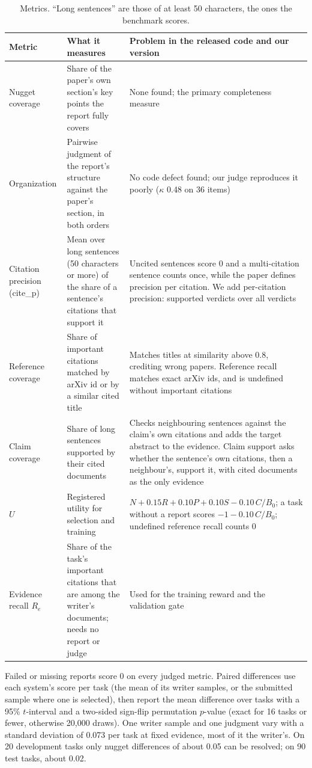 \documentclass[11pt, letterpaper]{article}
\begin{document}
\begin{table}[H]
\centering\footnotesize\setlength{\tabcolsep}{3pt}
\begin{tabularx}{\linewidth}{>{\raggedright}p{2.6cm} X X}
\toprule
Metric & What it measures & Problem in the released code and our version\\
\midrule
Nugget coverage & Share of the paper's own section's key points the report fully covers & None found;
the primary completeness measure\\
Organization & Pairwise judgment of the report's structure against the paper's section, in both
orders & No code defect found; our judge reproduces it poorly ($\kappa$ 0.48 on 36 items)\\
Citation precision (cite\_p) & Mean over long sentences (50 characters or more) of the share of a
sentence's citations that support it & Uncited sentences score 0 and a multi-citation sentence counts
once, while the paper defines precision per citation. We add per-citation precision: supported
verdicts over all verdicts\\
Reference coverage & Share of important citations matched by arXiv id or by a similar cited title & Matches titles at
similarity above 0.8, crediting wrong papers. Reference recall matches exact arXiv ids, and is
undefined without important citations\\
Claim coverage & Share of long sentences supported by their cited documents & Checks neighbouring
sentences against the claim's own citations and adds the target abstract to the evidence. Claim
support asks whether the sentence's own citations, then a neighbour's, support it, with cited
documents as the only evidence\\
$U$ & Registered utility for selection and training & $N + 0.15R + 0.10P + 0.10S - 0.10\,C/B_0$; a
task without a report scores $-1 - 0.10\,C/B_0$; undefined reference recall counts 0\\
Evidence recall $R_e$ & Share of the task's important citations that are among the writer's documents; needs no report
or judge & Used for the training reward and the validation gate\\
\bottomrule
\end{tabularx}
\caption{Metrics. ``Long sentences'' are those of at least 50 characters, the ones the benchmark
scores.}
\end{table}

Failed or missing reports score 0 on every judged metric. Paired differences use each system's score
per task (the mean of its writer samples, or the submitted sample where one is selected), then report the mean difference over tasks with a 95\% $t$-interval
and a two-sided sign-flip permutation $p$-value (exact for 16 tasks or fewer, otherwise 20,000
draws). One writer sample and one judgment vary with a standard deviation of 0.073 per task at
fixed evidence, most of it the writer's. On 20 development tasks only nugget differences of about
0.05 can be resolved; on 90 test tasks, about 0.02.
\end{document}
